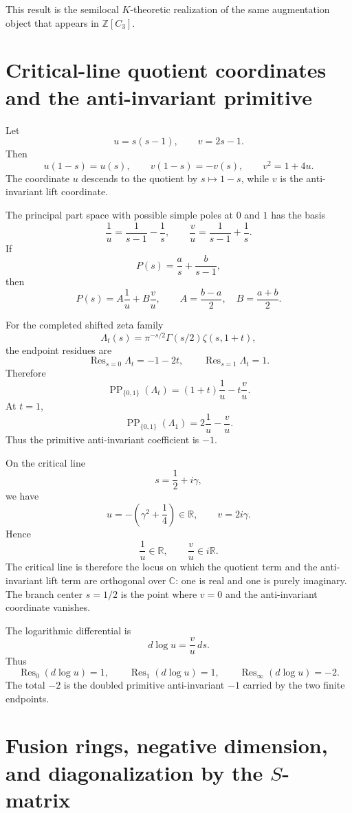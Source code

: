 \documentclass[11pt]{article}
\theoremstyle{remark}
\DeclareMathOperator{\Res}{Res}
\newcommand{\ZZ}{\mathbb Z}
\newcommand{\RR}{\mathbb R}
\newcommand{\CC}{\mathbb C}
\begin{document}
This result is the semilocal $K$-theoretic realization of the same augmentation object that appears in $\ZZ[C_3]$.

\section{Critical-line quotient coordinates and the anti-invariant primitive}

Let
\[
        u=s(s-1),
        \qquad
        v=2s-1.
\]
Then
\[
        u(1-s)=u(s),
        \qquad
        v(1-s)=-v(s),
        \qquad
        v^2=1+4u.
\]
The coordinate $u$ descends to the quotient by $s\mapsto1-s$, while $v$ is the anti-invariant lift coordinate.

The principal part space with possible simple poles at $0$ and $1$ has the basis
\[
        \frac1u=\frac1{s-1}-\frac1s,
        \qquad
        \frac vu=\frac1{s-1}+\frac1s.
\]
If
\[
        P(s)=\frac a s+\frac b{s-1},
\]
then
\[
        P(s)=A\frac1u+B\frac vu,
        \qquad
        A=\frac{b-a}{2},
        \quad B=\frac{a+b}{2}.
\]

For the completed shifted zeta family
\[
        \Lambda_t(s)=\pi^{-s/2}\Gamma(s/2)\zeta(s,1+t),
\]
the endpoint residues are
\[
        \Res_{s=0}\Lambda_t=-1-2t,
        \qquad
        \Res_{s=1}\Lambda_t=1.
\]
Therefore
\[
        \operatorname{PP}_{\{0,1\}}(\Lambda_t)
        =(1+t)\frac1u-t\frac vu.
\]
At $t=1$,
\[
        \operatorname{PP}_{\{0,1\}}(\Lambda_1)=2\frac1u-\frac vu.
\]
Thus the primitive anti-invariant coefficient is $-1$.

On the critical line
\[
        s=\frac12+i\gamma,
\]
we have
\[
        u=-\left(\gamma^2+\frac14\right)\in\RR,
        \qquad
        v=2i\gamma.
\]
Hence
\[
        \frac1u\in\RR,
        \qquad
        \frac vu\in i\RR.
\]
The critical line is therefore the locus on which the quotient term and the anti-invariant lift term are orthogonal over $\CC$: one is real and one is purely imaginary.  The branch center $s=1/2$ is the point where $v=0$ and the anti-invariant coordinate vanishes.

The logarithmic differential is
\[
        d\log u=\frac vu\,ds.
\]
Thus
\[
        \Res_0(d\log u)=1,
        \qquad
        \Res_1(d\log u)=1,
        \qquad
        \Res_\infty(d\log u)=-2.
\]
The total $-2$ is the doubled primitive anti-invariant $-1$ carried by the two finite endpoints.

\section{Fusion rings, negative dimension, and diagonalization by the $S$-matrix}
\end{document}
